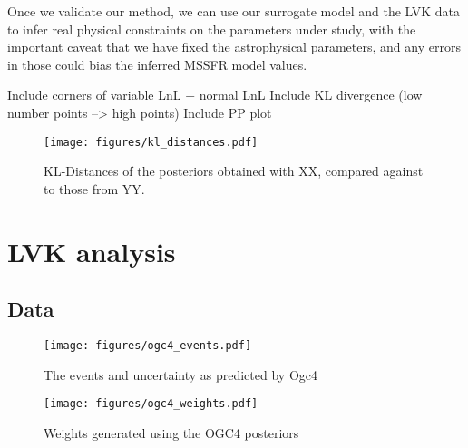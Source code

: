 \documentclass[twocolumn]{aastex631}
\begin{document}
Once we validate our method, we can use our surrogate model and the LVK data to infer real physical constraints on the parameters under study, with the important caveat that we have fixed the astrophysical parameters, and any errors in those could bias the inferred \ac{MSSFR} model values.

Include corners of variable LnL + normal LnL
Include KL divergence (low number points --> high points)
Include PP plot





\begin{figure}[ht!]
    \begin{centering}
        \texttt{[image: figures/kl\_distances.pdf]}
        \caption{
            KL-Distances of the posteriors obtained with XX, compared against to those from YY.
        }
        \label{fig:kl_distances}
    \end{centering}
\end{figure}




\section{LVK analysis}
\subsection{Data}

\begin{figure}[ht!]
    \begin{centering}
        \texttt{[image: figures/ogc4\_events.pdf]}
        \caption{
            The events and uncertainty as predicted by Ogc4
        }
        \label{fig:ogc4_events}
    \end{centering}
\end{figure}

\begin{figure}[ht!]
    \begin{centering}
        \texttt{[image: figures/ogc4\_weights.pdf]}
        \caption{
            Weights generated using the OGC4 posteriors
        }
        \label{fig:ogc4_weights}
    \end{centering}
\end{figure}
\end{document}
